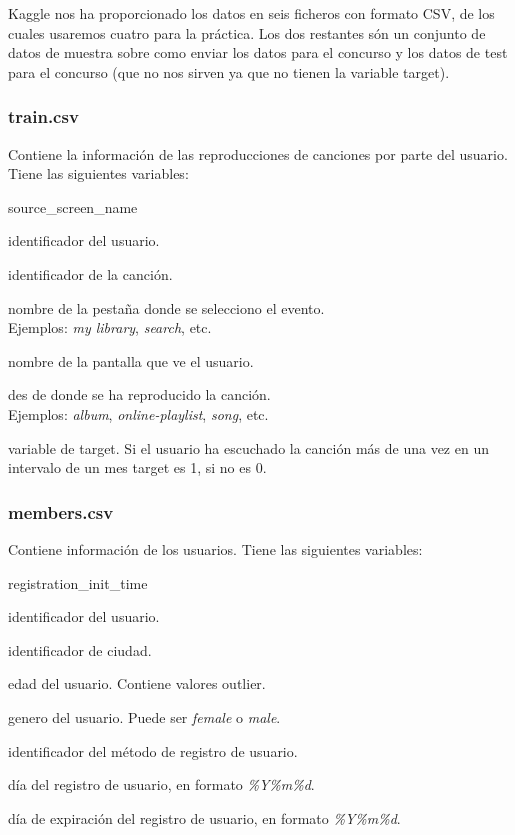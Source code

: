 \documentclass[a4paper]{article}
\begin{document}
Kaggle nos ha proporcionado los datos en seis ficheros con formato CSV, de los cuales usaremos cuatro para la práctica. Los dos restantes són un conjunto de datos de muestra sobre como enviar los datos para el concurso y los datos de test para el concurso (que no nos sirven ya que no tienen la variable target).

\subsubsection*{train.csv}

Contiene la información de las reproducciones de canciones por parte del usuario. Tiene las siguientes variables:

\begin{labeling}{source\_screen\_name}
\item [msno] identificador del usuario.
\item [song\_id] identificador de la canción.
\item [source\_system\_tab] nombre de la pestaña donde se selecciono el evento.\\
Ejemplos: \textit{my library}, \textit{search}, etc.
\item [source\_screen\_name] nombre de la pantalla que ve el usuario.
\item [source\_type] des de donde se ha reproducido la canción.\\
Ejemplos: \textit{album}, \textit{online-playlist}, \textit{song}, etc.
\item [target] variable de target. Si el usuario ha escuchado la canción más de una vez en un intervalo de un mes target es 1, si no es 0.
\end{labeling}

\subsubsection*{members.csv}

Contiene información de los usuarios. Tiene las siguientes variables:

\begin{labeling}{registration\_init\_time}
\item [msno] identificador del usuario.
\item [city] identificador de ciudad.
\item [bd] edad del usuario. Contiene valores outlier.
\item [gender] genero del usuario. Puede ser \textit{female} o \textit{male}.
\item [registered\_via] identificador del método de registro de usuario.
\item [registration\_init\_time] día del registro de usuario, en formato \textit{\%Y\%m\%d}.
\item [expiration\_date] día de expiración del registro de usuario, en formato \textit{\%Y\%m\%d}.
\end{labeling}
\end{document}
